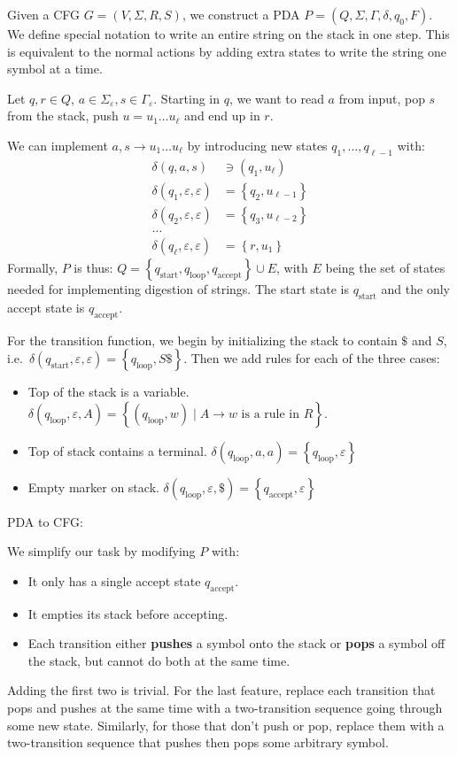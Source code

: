 \documentclass[12 pt]{article}
\begin{document}
Given a CFG $G = (V, \Sigma, R, S)$, we construct a PDA $P = (Q,
\Sigma, \Gamma, \delta, q_0, F)$. We define special notation to write
an entire string on the stack in one step. This is equivalent to the
normal actions by adding extra states to write the string one symbol
at a time.

Let $q, r \in Q$, $a \in \Sigma_\varepsilon, s \in
\Gamma_{\varepsilon}$. Starting in $q$, we want to read $a$ from
input, pop $s$ from the stack, push $u = u_1 \ldots u_\ell$ and end up
in $r$.

We can implement $a,s \to u_1 \ldots u_\ell$ by introducing new states
$q_1, \ldots, q_{\ell - 1}$ with:
\begin{align*}
  \delta(q,a,s) & \ni (q_1, u_\ell)
  \\ \delta(q_1, \varepsilon, \varepsilon) & = \left\{q_2, u_{\ell - 1}\right\}
  \\ \delta(q_2, \varepsilon, \varepsilon) & = \left\{q_3, u_{\ell - 2}\right\}
  \\ \ldots
  \\ \delta(q_\ell, \varepsilon, \varepsilon) & = \left\{r, u_{1}\right\}
\end{align*}
Formally, $P$ is thus: $Q = \left\{q_{\text{start}}, q_{\text{loop}},
  q_{\text{accept}}\right\} \cup E$, with $E$ being the set of states
needed for implementing digestion of strings. The start state is
$q_{\text{start}}$ and the only accept state is $q_{\text{accept}}$.

For the transition function, we begin by initializing the stack to
contain $\$$ and $S$, i.e.\ $\delta(q_{\text{start}}, \varepsilon,
\varepsilon) = \left\{q_{\text{loop}}, S\$\right\}$. Then we add rules
for each of the three cases:
\begin{itemize}
\item Top of the stack is a variable. $\delta(q_{\text{loop}},
  \varepsilon, A) = \left\{(q_{\text{loop}}, w) \mid A \to w \text{ is
    a rule in } R\right\}$.
\item Top of stack contains a terminal. $\delta(q_{\text{loop}},
  a, a) = \left\{q_{\text{loop}}, \varepsilon\right\}$
\item Empty marker on stack. $\delta(q_{\text{loop}}, \varepsilon, \$)
  = \left\{q_{\text{accept}}, \varepsilon\right\}$
\end{itemize}
PDA to CFG:\

We simplify our task by modifying $P$ with:
\begin{itemize}
\item It only has a single accept state $q_{\text{accept}}$.
\item It empties its stack before accepting.
\item Each transition either \textbf{pushes} a symbol onto the stack
  or \textbf{pops} a symbol off the stack, but cannot do both at the
  same time.
\end{itemize}
Adding the first two is trivial. For the last feature, replace each
transition that pops and pushes at the same time with a two-transition
sequence going through some new state. Similarly, for those that don't push or
pop, replace them with a two-transition sequence that pushes then pops
some arbitrary symbol.
\end{document}
